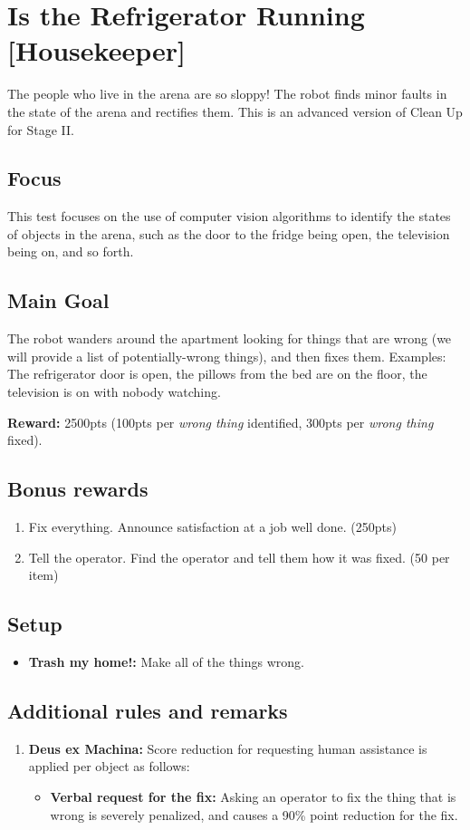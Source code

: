 \section{Is the Refrigerator Running [Housekeeper]}
The people who live in the arena are so sloppy! The robot finds minor faults in the state of the arena and rectifies them. This is an advanced version of Clean Up for Stage II.

\subsection{Focus}
This test focuses on the use of computer vision algorithms to identify the states of objects in the arena, such as the door to the fridge being open, the television being on, and so forth.

\subsection{Main Goal}
The robot wanders around the apartment looking for things that are wrong (we will provide a list of potentially-wrong things), and then fixes them. Examples: The refrigerator door is open, the pillows from the bed are on the floor, the television is on with nobody watching.

\noindent\textbf{Reward:} 2500pts (100pts per \textit{wrong thing} identified, 300pts per \textit{wrong thing} fixed).

\subsection{Bonus rewards}
\begin{enumerate}[nosep]
	\item Fix everything. Announce satisfaction at a job well done. (250pts)
	\item Tell the operator. Find the operator and tell them how it was fixed. (50 per item)
\end{enumerate}


\subsection{Setup}
\begin{itemize}[nosep]
	\item \textbf{Trash my home!:} Make all of the things wrong.
\end{itemize}

\subsection{Additional rules and remarks}
\begin{enumerate}[nosep]
	\item \textbf{Deus ex Machina:} Score reduction for requesting human assistance is applied per object as follows:
	\begin{itemize}[nosep]
		\item \textbf{Verbal request for the fix:} Asking an operator to fix the thing that is wrong is severely penalized, and causes a 90\% point reduction for the fix.	
	\end{itemize}
\end{enumerate}

